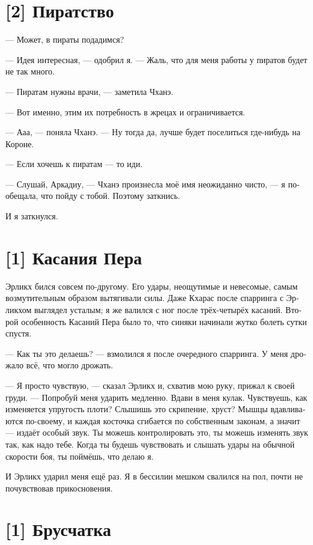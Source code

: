 \documentclass[a4paper,12pt,fleqn]{book}\usepackage{cooltooltips}\usepackage{polyglossia}\setdefaultlanguage[babelshorthands=true]{russian}\setotherlanguage{english}\defaultfontfeatures{Ligatures=TeX,Mapping=tex-text} \usepackage{xcolor}\definecolor{lightgray}{HTML}{bbbbbb}\color{lightgray}\newcommand{\ml}[3]{\textenglish{\textcolor{black}{#3}}}
\begin{document}
{\section{[2] Пиратство}

--- Может, в пираты подадимся?

--- Идея интересная, --- одобрил я.
--- Жаль, что для меня работы у пиратов будет не так много.

--- Пиратам нужны врачи, --- заметила Чханэ.

--- Вот именно, этим их потребность в жрецах и ограничивается.

--- Ааа, --- поняла Чханэ.
--- Ну тогда да, лучше будет поселиться где-нибудь на Короне.

--- Если хочешь к пиратам --- то иди.

--- Слушай, Аркадиу, --- Чханэ произнесла моё имя неожиданно чисто, --- я пообещала, что пойду с тобой.
Поэтому заткнись.

И я заткнулся.

\section{[1] Касания Пера}

Эрликх бился совсем по-другому.
Его удары, неощутимые и невесомые, самым возмутительным образом вытягивали силы.
Даже Кхарас после спарринга с Эрликхом выглядел усталым;
я же валился с ног после трёх-четырёх касаний.
Второй особенность Касаний Пера было то, что синяки начинали жутко болеть сутки спустя.

--- Как ты это делаешь? --- взмолился я после очередного спарринга.
У меня дрожало всё, что могло дрожать.

--- Я просто чувствую, --- сказал Эрликх и, схватив мою руку, прижал к своей груди.
--- Попробуй меня ударить медленно.
Вдави в меня кулак.
Чувствуешь, как изменяется упругость плоти?
Слышишь это скрипение, хруст?
Мышцы вдавливаются по-своему, и каждая косточка сгибается по собственным законам, а значит --- издаёт особый звук.
Ты можешь контролировать это, ты можешь изменять звук так, как надо тебе.
Когда ты будешь чувствовать и слышать удары на обычной скорости боя, ты поймёшь, что делаю я.

И Эрликх ударил меня ещё раз.
Я в бессилии мешком свалился на пол, почти не почувствовав прикосновения.

\section{[1] Брусчатка}

}
\end{document}
